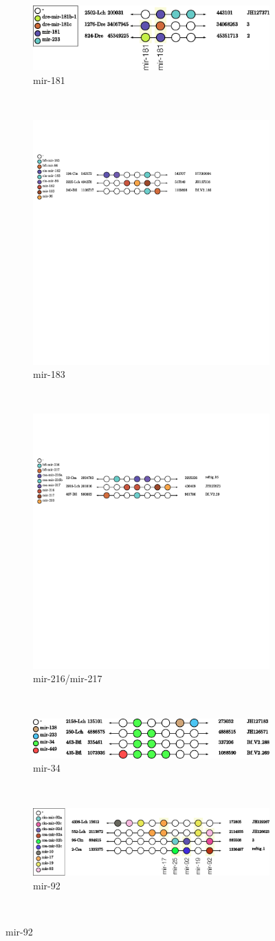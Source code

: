 \documentclass[11pt]{article}
\begin{document}
\begin{figure}[ht!]
\begin{subfigure}[t]{0.45\textwidth}
     \end{subfigure}
        ~
     \\
    \begin{subfigure}[t]{0.45\textwidth}
        \centering
        \includegraphics[height=1.2 cm]{Cluster_images/mir-181_105_2502}
        \caption{mir-181}
 \label{mir-181}
       \end{subfigure}
        ~
         \begin{subfigure}[t]{0.45\textwidth}
        \centering
        \includegraphics[height=1.2 cm]{Cluster_images/mir-183_132_240}
        \caption{mir-183}
 \label{mir-183}
    \end{subfigure}
    \\
    \begin{subfigure}[t]{0.45\textwidth}
        \centering
        \includegraphics[height=1.2 cm]{Cluster_images/mir-216_126_467}
        \caption{mir-216/mir-217}
 \label{mir-216/mir-217}       
\end{subfigure}
     \\
    \begin{subfigure}[t]{0.45\textwidth}
        \centering
        \includegraphics[height=1.2 cm]{Cluster_images/mir-34_11A_435}
        \caption{mir-34}
 \label{mir-34}       
\end{subfigure}
        ~
         \begin{subfigure}[t]{0.45\textwidth}
        \centering
        \includegraphics[height=1.2 cm]{Cluster_images/mir-92_281_4336}
        \caption{mir-92}
\label{mir-92}
    \end{subfigure}
    \\

\end{figure}
\end{document}
